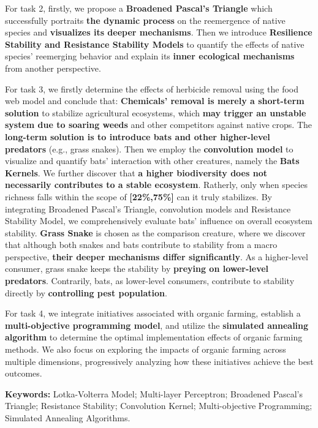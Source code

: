\documentclass[12pt]{article}
\begin{document}
	For task 2, firstly, we propose a \textbf{Broadened Pascal's Triangle }which successfully portraits \textbf{the dynamic process} on the reemergence of native species and \textbf{visualizes its deeper mechanisms}. Then we introduce \textbf{Resilience Stability and Resistance Stability Models} to quantify the effects of native species' reemerging behavior and explain its \textbf{inner ecological mechanisms} from another perspective.
	
	For task 3, we firstly determine the effects of herbicide removal using the food web model and conclude that: \textbf{Chemicals' removal is merely a short-term solution} to stabilize agricultural ecosystems, which \textbf{may trigger an unstable system due to soaring weeds} and other competitors against native crops. The \textbf{long-term solution is to introduce bats and other higher-level predators} (e.g., grass snakes). Then we employ the \textbf{convolution model} to visualize and quantify bats' interaction with other creatures, namely the \textbf{Bats Kernels}. We further discover that \textbf{a higher biodiversity does not necessarily contributes to a stable ecosystem}. Ratherly, only when species richness falls within the scope of \textbf{[22\%,75\%]} can it truly stabilizes. By integrating Broadened Pascal's Triangle, convolution models and Resistance Stability Model, we comprehensively evaluate bats' influence on overall ecosystem stability. \textbf{Grass Snake} is chosen as the comparison creature, where we discover that although both snakes and bats contribute to stability from a macro perspective, \textbf{their deeper mechanisms differ significantly}. As a higher-level consumer, grass snake keeps the stability by \textbf{preying on lower-level predators}. Contrarily, bats, as lower-level consumers, contribute to stability directly by \textbf{controlling pest population}.  
	
	For task 4, we integrate initiatives associated with organic farming, establish a \textbf{multi-objective programming model}, and utilize the \textbf{simulated annealing algorithm} to determine the optimal implementation effects of organic farming methods. We also focus on exploring the impacts of organic farming across multiple dimensions, progressively analyzing how these initiatives achieve the best outcomes.
	
	\textbf{Keywords: }Lotka-Volterra Model; Multi-layer Perceptron; Broadened Pascal's Triangle; Resistance Stability; Convolution Kernel; Multi-objective Programming; Simulated Annealing Algorithms.
	
\end{document}
